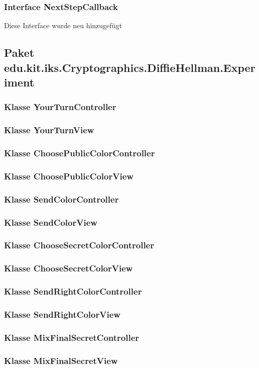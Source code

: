 \documentclass{article}
\begin{document}
	\subsubsection{Interface NextStepCallback}
    Diese Interface wurde neu hinzugefügt

  \subsection{Paket edu.kit.iks.Cryptographics.DiffieHellman.Experiment}

	\subsubsection{Klasse YourTurnController}

	\subsubsection{Klasse YourTurnView}

	\subsubsection{Klasse ChoosePublicColorController}

	\subsubsection{Klasse ChoosePublicColorView}

	\subsubsection{Klasse SendColorController}

	\subsubsection{Klasse SendColorView}

	\subsubsection{Klasse ChooseSecretColorController}

	\subsubsection{Klasse ChooseSecretColorView}

	\subsubsection{Klasse SendRightColorController}

	\subsubsection{Klasse SendRightColorView}

	\subsubsection{Klasse MixFinalSecretController}

	\subsubsection{Klasse MixFinalSecretView}
	
 \restoregeometry

\glsaddall
\printglossary[numberedsection, style=altlist]
\end{document}
